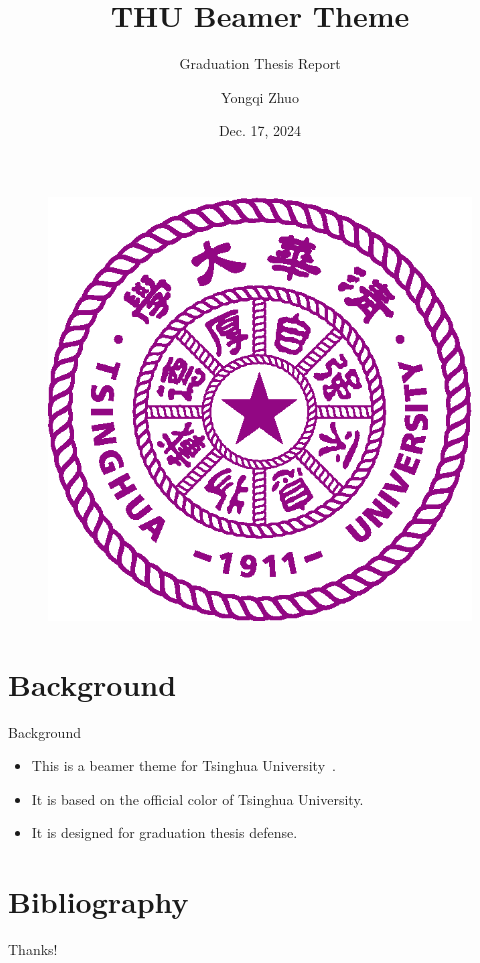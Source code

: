 \documentclass{beamer}
\author{Yongqi Zhuo}
\title{THU Beamer Theme}
\subtitle{Graduation Thesis Report}
\institute{Institute of Interdisciplinary Information Sciences, Tsinghua University}
\date{Dec. 17, 2024}
\begin{document}
\begin{frame}
    \titlepage
    \begin{figure}[htpb]
        \begin{center}
            \includegraphics[width=0.2\linewidth]{pic/Tsinghua_University_Logo.eps}
        \end{center}
    \end{figure}
\end{frame}

\begin{frame}
    \tableofcontents[sectionstyle=show,subsectionstyle=show/shaded/hide,subsubsectionstyle=show/shaded/hide]
\end{frame}


\section{Background}

\begin{frame}{Background}
    \begin{itemize}
        \item This is a beamer theme for Tsinghua University~\cite{origin}.
        \item It is based on the official color of Tsinghua University.
        \item It is designed for graduation thesis defense.
    \end{itemize}
\end{frame}

\section{Bibliography}

\begin{frame}[allowframebreaks]
    
    
\end{frame}

\begin{frame}
    \begin{center}
        {\Huge\calligra Thanks!}
    \end{center}
\end{frame}
\end{document}
